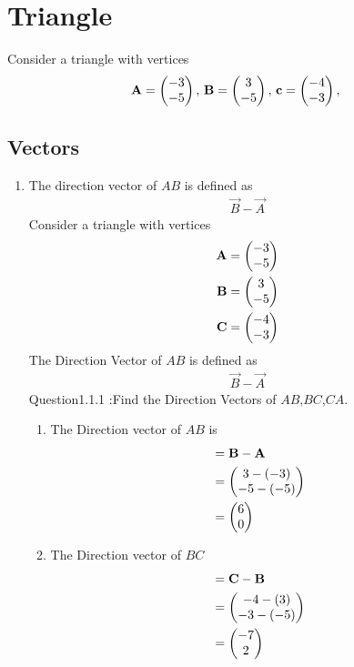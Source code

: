 \documentclass[11pt]{book}
\begin{document}
\frontmatter
\tableofcontents
\setcounter{page}{1}
\mainmatter
\chapter{Triangle}
Consider a triangle with vertices
\begin{align}
\label{eq:tri-pts}
\vec{A}=\myvec{-3 \\ -5},\,
\vec{B}=\myvec{3\\-5},\,
	\vec{c}=\myvec{-4\\-3},\,
\end{align}

\section{Vectors}


\begin{enumerate}[label=\thesection.\arabic*.,ref=\thesection.\theenumi]

\item The direction vector of $AB$ is defined as
		\begin{align}
			\vec{B}-
			\vec{A}
		\end{align}
Consider a triangle with vertices
\begin{align} 
 \mathbf{A} &= \begin{pmatrix} -3\\ -5 \end{pmatrix} \\ \mathbf{B} &= \begin{pmatrix} 3\\ -5 \end{pmatrix}
  \\\mathbf{C} &= \begin{pmatrix} -4\\ -3\end{pmatrix}
 \end{align}
The Direction Vector of $AB$ is defined as 
\begin{align} 
\vec{B} - \vec{A}
\end{align}
Question1.1.1 :Find the Direction Vectors of $AB$,$BC$,$CA$.\\
\solution

\begin{enumerate} 
\item  The Direction vector of $AB$ is \begin{align} &= \mathbf{B} - \mathbf{A} \\
 &= \begin{pmatrix} 3 - (-3)\\ -5 - (-5) \end{pmatrix} \\&= \begin{pmatrix} 6\\ 0 \end{pmatrix}
 \end{align}
 
\item The Direction vector of $BC$ \begin{align}&= \vec{C} - \vec{B}\\
 &= \myvec{ -4 - (3)\\ -3 - (-5) } \\&= \myvec{-7 \\ 2 }
  \end{align}
  

\end{enumerate}
\end{enumerate}
\end{document}
